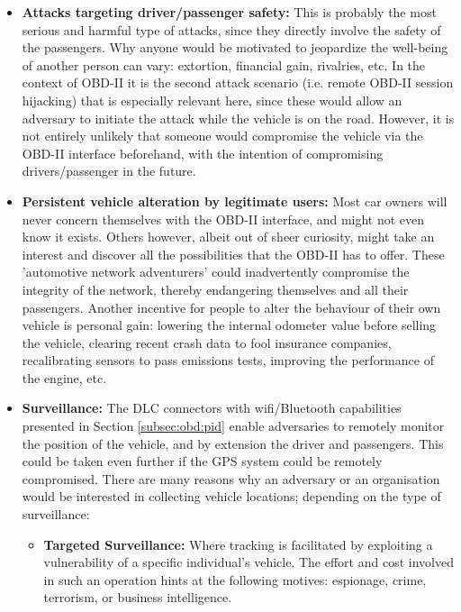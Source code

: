 \begin{itemize}
	\item \textbf{Attacks targeting driver/passenger safety:} This is probably the most serious and harmful type of attacks, since they directly involve the safety of the passengers. Why anyone would be motivated to jeopardize the well-being of another person can vary: extortion, financial gain, rivalries, etc. In the context of OBD-II it is the second attack scenario (i.e. remote OBD-II session hijacking) that is especially relevant here, since these would allow an adversary to initiate the attack while the vehicle is on the road. However, it is not entirely unlikely that someone would compromise the vehicle via the OBD-II interface beforehand, with the intention of compromising drivers/passenger in the future.
	
	\item \textbf{Persistent vehicle alteration by legitimate users:} Most car owners will never concern themselves with the OBD-II interface, and might not even know it exists. Others however, albeit out of sheer curiosity, might take an interest and discover all the possibilities that the OBD-II has to offer. These 'automotive network adventurers' could inadvertently compromise the integrity of the network, thereby endangering themselves and all their passengers. Another incentive for people to alter the behaviour of their own vehicle is personal gain: lowering the internal odometer value before selling the vehicle, clearing recent crash data to fool insurance companies, recalibrating sensors to pass emissions tests, improving the performance of the engine, etc.  
	
	\item \textbf{Surveillance:} The DLC connectors with wifi/Bluetooth capabilities presented in Section \ref{subsec:obd:pid} enable adversaries to remotely monitor the position of the vehicle, and by extension the driver and passengers. This could be taken even further if the GPS system could be remotely compromised. There are many reasons why an adversary or an organisation would be interested in collecting vehicle locations; depending on the type of surveillance: 
	\begin{itemize}
		\item \textbf{Targeted Surveillance:} Where tracking is facilitated by exploiting a vulnerability of a specific individual's vehicle. The effort and cost involved in such an operation hints at the following motives: espionage, crime, terrorism, or business intelligence.
		

\end{itemize}
\end{itemize}
